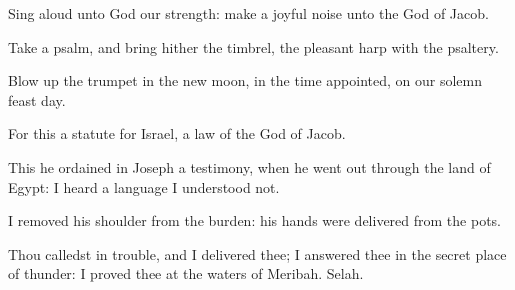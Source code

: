 {\Q {}Sing
aloud unto
God our
strength: make a joyful
noise unto the
God of
Jacob.


\par }{\Q {}Take a
psalm, and
bring hither the
timbrel, the
pleasant
harp with the
psaltery.


\par }{\Q {}Blow
up the
trumpet in the new
moon, in the time
appointed, on our solemn
feast
day.


\par }{\Q {}For this
{} a
statute for
Israel,
{} a
law of the
God of
Jacob.


\par }{\Q {}This he
ordained in
Joseph
{} a
testimony, when he went
out through the
land of
Egypt:
{} I
heard a
language
{} I
understood not.


\par }{\Q {}I
removed his
shoulder from the
burden: his
hands were
delivered from the
pots.


\par }{\Q {}Thou
calledst in
trouble, and I
delivered thee; I
answered thee in the secret
place of
thunder: I
proved thee at the
waters of
Meribah.
Selah.


\par }{\BB \par }
